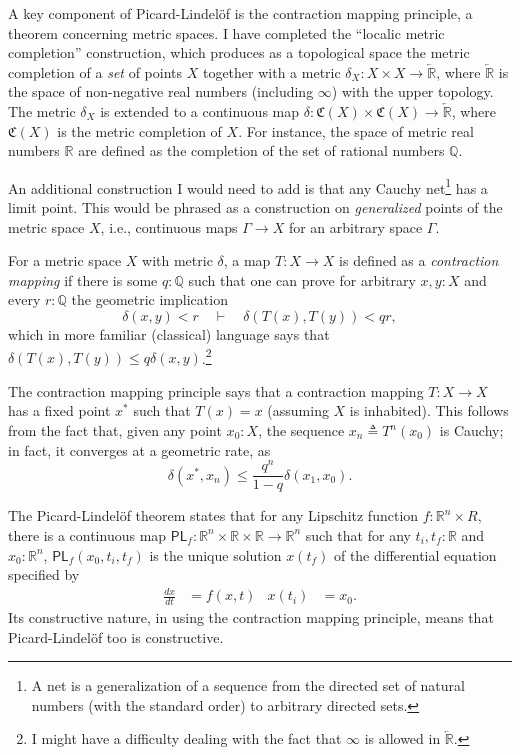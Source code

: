 \documentclass{article}           %
\newcommand{\R}{\mathbb{R}}
\newcommand{\rat}{\mathbb{Q}}
\newcommand{\upperT}[1]{\overleftarrow{#1}}
\newcommand{\defeq}{\triangleq}
\begin{document}
A key component of Picard-Lindelöf is the contraction mapping principle, a theorem concerning metric spaces. I have completed the ``localic metric completion'' construction, which produces as a topological space the metric completion of a \emph{set} of points $X$ together with a metric $\delta_X : X \times X \to \upperT{\R}$, where $\upperT{\R}$ is the space of non-negative real numbers (including $\infty$) with the upper topology. The metric $\delta_X$ is extended to a continuous map $\delta : \mathfrak{C}(X) \times \mathfrak{C}(X) \to \upperT{\R}$, where $\mathfrak{C}(X)$ is the metric completion of $X$.
For instance, the space of metric real numbers $\R$ are defined as the completion of the set of rational numbers $\rat$.

An additional construction I would need to add is that any Cauchy net\footnote{A net is a generalization of a sequence from the directed set of natural numbers (with the standard order) to arbitrary directed sets.} has a limit point. This would be phrased as a construction on \emph{generalized} points of the metric space $X$, i.e., continuous maps $\Gamma \to X$ for an arbitrary space $\Gamma$.

For a metric space $X$ with metric $\delta$, a map $T : X \to X$ is defined as a \emph{contraction mapping} if there is some $q : \rat$ such that one can prove for arbitrary $x, y : X$ and every $r : \rat$ the geometric implication
\[
\delta(x, y) < r
\quad \vdash \quad
\delta(T(x), T(y)) < q r,
\]
which in more familiar (classical) language says that $\delta(T(x), T(y)) \le q \delta(x, y)$.\footnote{I might have a difficulty dealing with the fact that $\infty$ is allowed in $\upperT{\R}$.}

The contraction mapping principle says that a contraction mapping $T : X \to X$ has a fixed point $x^*$ such that $T(x) = x$ (assuming $X$ is inhabited). This follows from the fact that, given any point $x_0 : X$, the sequence $x_n \defeq T^n(x_0)$ is Cauchy; in fact, it converges at a geometric rate, as
\[
\delta(x^*, x_n) \le \frac{q^n}{1 - q} \delta(x_1, x_0).
\]

The Picard-Lindelöf theorem states that for any Lipschitz function $f : \R^n \times R$, there is a continuous map $\mathsf{PL}_f : \R^n \times \R \times \R \to \R^n$ such that for any $t_i, t_f : \R$ and $x_0 : \R^n$, $\mathsf{PL}_f(x_0, t_i, t_f)$ is the unique solution $x(t_f)$ of the differential equation specified by
\begin{align*}
\frac{dx}{dt} &= f(x, t)
&
x(t_i) &= x_0.
\end{align*}
Its constructive nature, in using the contraction mapping principle, means that Picard-Lindelöf too is constructive.
\end{document}
